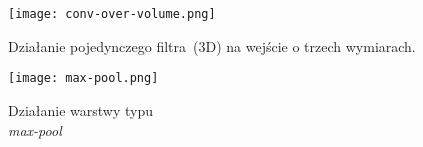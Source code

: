 \begin{figure}[h]
	\centering
	\begin{minipage}[c]{0.45\textwidth}
		\texttt{[image: conv-over-volume.png]}
		\caption{Działanie pojedynczego filtra~(3D) na wejście o trzech wymiarach.}
		\label{fig:conv-over-vol}
	\end{minipage}
	\hspace{3em}
	\begin{minipage}[c]{0.45\textwidth}
		\vspace{-0.5em}
		\texttt{[image: max-pool.png]}
		\vspace{1.5em}
		\caption{Działanie warstwy typu \\ \textit{max-pool}}
		\label{fig:max-pool}
	\end{minipage}	
\end{figure}




%
%
%
%
%

